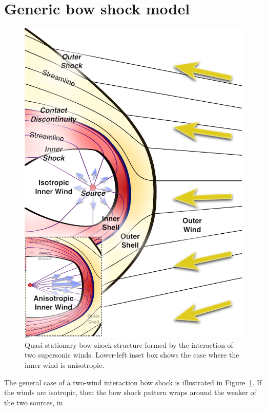 \section{Generic bow shock model}
\label{sec:generic-model}

\begin{figure}
\includegraphics[width=\linewidth]{figs/generic-bowshock}
\caption{Quasi-stationary bow shock structure formed by the
  interaction of two supersonic winds.  Lower-left inset box shows the
  case where the inner wind is anisotropic.   
}
\label{fig:2-winds}
\end{figure}

The general case of a two-wind interaction bow shock is illustrated in
Figure~\ref{fig:2-winds}.  If the winds are isotropic, then the bow
shock pattern wraps around the weaker of the two sources, in 

